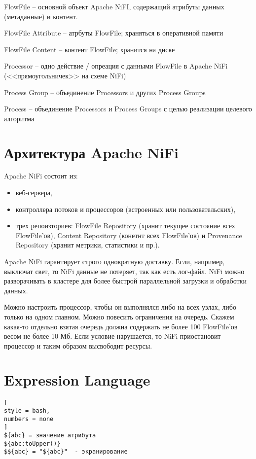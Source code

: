 \documentclass[%
	11pt,
	a4paper,
	utf8,
		]{article}
\begin{document}
FlowFile -- основной объект Apache NiFI, содержащий атрибуты данных (метаданные) и контент.

FlowFile Attribute -- атрбуты FlowFile; храняться в оперативной памяти

FlowFile Content -- контент FlowFile; хранится на диске

Processor -- одно действие / опреация с данными FlowFile в Apache NiFi (<<прямоугольничек>> на схеме NiFi)

Process Group -- объединение Processors и других Process Groups

Process -- объединение Processors и Process Groups с целью реализации целевого алгоритма

\section{Архитектура Apache NiFi}

Apache NiFi состоит из:
\begin{itemize}
	\item веб-сервера,
	
	\item контроллера потоков и процессоров (встроенных или пользовательских),
	
	\item трех репоизториев: FlowFile Repository (хранит текущее состояние всех FlowFile'ов), Content Repository (конетнт всех FlowFile'ов) и Provenance Repository (хранит метрики, статистики и пр.).
\end{itemize}

Apache NiFi гарантирует строго однократную доставку. Если, например, выключат свет, то NiFi данные не потеряет, так как есть лог-файл. NiFi можно разворачивать в кластере для более быстрой параллельной загрузки и обработки данных.

Можно настроить процессор, чтобы он выполнялся либо на всех узлах, либо только на одном главном. Можно повесить ограничения на очередь. Скажем какая-то отдельно взятая очередь должна содержать не более 100 FlowFile'ов весом не более 10 Мб. Если условие нарушается, то NiFi приостановит процессор и таким образом высвободит ресурсы.

\section{Expression Language}

\begin{lstlisting}[
style = bash,
numbers = none
]
${abc} = значение атрибута
${abc:toUpper()}
$${abc} = "${abc}"  - экранирование
\end{lstlisting}
\end{document}
